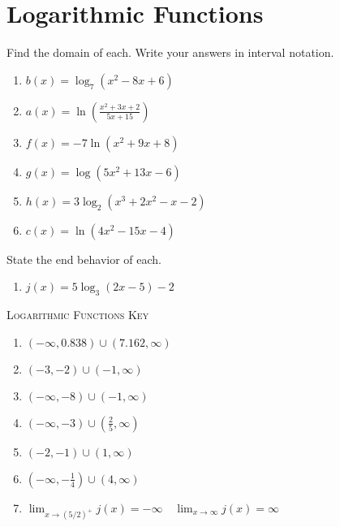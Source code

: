 \chapter{Logarithmic Functions}

Find the domain of each. Write your answers in interval notation.
\begin{enumerate}
	\item $b(x) = \log_7\left(x^2 - 8x + 6\right)$
	\item $a(x) = \ln\left(\frac{x^2+3x+2}{5x+15}\right)$
	\item $f(x) = -7\ln\left(x^2 + 9x + 8\right)$
	\item $g(x) = \log\left(5x^2 + 13x - 6\right)$
	\item $h(x) = 3\log_2\left(x^3+2x^2-x-2\right)$
	\item $c(x) = \ln\left(4x^2 - 15x - 4\right)$
\end{enumerate}
\setcounter{Review}{\value{enumi}}

State the end behavior of each.
\begin{enumerate}	\setcounter{enumi}{\value{Review}}
	\item $j(x) = 5\log_3\left(2x-5\right) - 2$
\end{enumerate}

\newpage

\textsc{Logarithmic Functions Key}

\begin{enumerate}
	\item $(-\infty, 0.838) \cup (7.162, \infty)$
    \item $(-3, -2) \cup (-1, \infty)$
    \item $(-\infty, -8) \cup (-1, \infty)$
    \item $(-\infty, -3) \cup \left(\frac{2}{5}, \infty\right)$
    \item $(-2, -1) \cup (1, \infty)$
    \item $\left(-\infty, -\frac{1}{4}\right) \cup (4, \infty)$
    \item $\lim_{x \to (5/2)^+} j(x) = -\infty \quad \lim_{x \to \infty} j(x) = \infty$ 
\end{enumerate}
